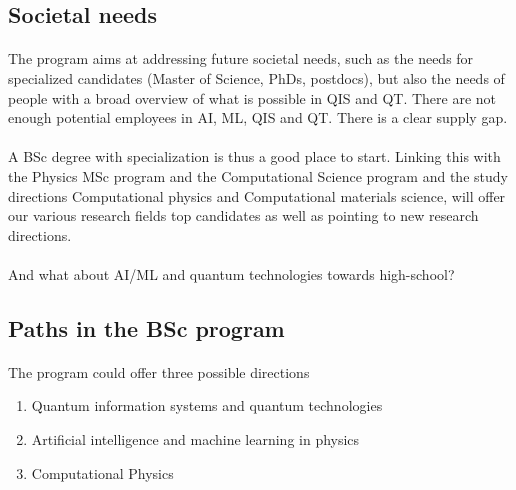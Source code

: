 \documentclass[%
oneside,                 %
final,                   %
10pt]{article}
\begin{document}
\noindent



\subsection{Societal needs}


\paragraph{}
The program aims at addressing future societal needs, such as the  needs for specialized candidates (Master of Science, PhDs, postdocs), but also the needs of  people with a broad overview of what is possible in  QIS and QT. There are  not enough potential employees in AI, ML, QIS and QT. There is  a clear supply gap.




\paragraph{}
A BSc degree  with specialization  is thus a good place to start. Linking this with the Physics MSc  program and the Computational Science program and the study directions Computational physics and Computational materials science, will offer our various research fields top candidates as well as pointing to new research directions.




\paragraph{}
And what about AI/ML and quantum technologies towards high-school?



\subsection{Paths in the BSc program}


\paragraph{}
The program could offer  three possible directions
\begin{enumerate}
\item Quantum information systems and quantum technologies

\item Artificial intelligence and machine learning in physics

\item Computational Physics
\end{enumerate}
\end{document}
